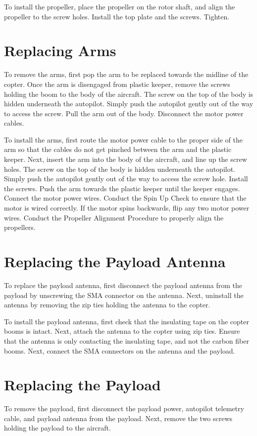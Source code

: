 \documentclass{report}
\begin{document}
		To install the propeller, place the propeller on the rotor shaft, and align the propeller to the screw holes.  Install the top plate and the screws.  Tighten.
	\section{Replacing Arms}
		To remove the arms, first pop the arm to be replaced towards the midline of the copter.  Once the arm is disengaged from plastic keeper, remove the screws holding the boom to the body of the aircraft.  The screw on the top of the body is hidden underneath the autopilot.  Simply push the autopilot gently out of the way to access the screw.  Pull the arm out of the body.  Disconnect the motor power cables.

		To install the arms, first route the motor power cable to the proper side of the arm so that the cables do not get pinched between the arm and the plastic keeper.  Next, insert the arm into the body of the aircraft, and line up the screw holes.  The screw on the top of the body is hidden underneath the autopilot.  Simply push the autopilot gently out of the way to access the screw hole.  Install the screws.  Push the arm towards the plastic keeper until the keeper engages.  Connect the motor power wires.  Conduct the Spin Up Check to ensure that the motor is wired correctly.  If the motor spins backwards, flip any two motor power wires.  Conduct the Propeller Alignment Procedure to properly align the propellers.
	\section{Replacing the Payload Antenna}
		To replace the payload antenna, first disconnect the payload antenna from the payload by unscrewing the SMA connector on the antenna.  Next, uninstall the antenna by removing the zip ties holding the antenna to the copter.

		To install the payload antenna, first check that the insulating tape on the copter booms is intact.  Next, attach the antenna to the copter using zip ties.  Ensure that the antenna is only contacting the insulating tape, and not the carbon fiber booms.  Next, connect the SMA connectors on the antenna and the payload.
	\section{Replacing the Payload}
		To remove the payload, first disconnect the payload power, autopilot telemetry cable, and payload antenna from the payload.  Next, remove the two screws holding the payload to the aircraft.
\end{document}
